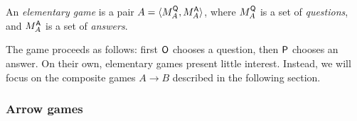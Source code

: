\begin{definition} %
An \emph{elementary game} is a pair
$A = \langle M_A^{ \mathsf{Q} }, M_A^{ \mathsf{A} } \rangle$, where
$M_A^{ \mathsf{Q} }$ is a set of \emph{questions}, and
$M_A^{ \mathsf{A} }$ is a set of \emph{answers}.
\end{definition}

The game proceeds as follows:
first $ \mathsf{O} $ chooses a question,
then $ \mathsf{P} $ chooses an answer.
On their own,
elementary games present little interest.
Instead, we will focus on
the composite games $A \rightarrow B$
described in the following section.

%
%
%
%
%


\subsubsection{Arrow games} %
\label{sec:arrow}

